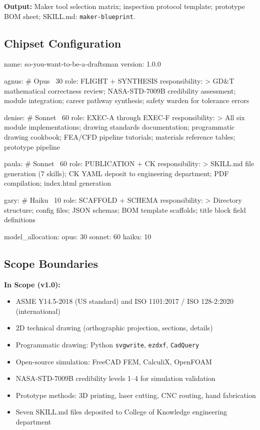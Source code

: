 \documentclass[11pt,letterpaper]{article}
\begin{document}
\textbf{Output:} Maker tool selection matrix; inspection protocol template; prototype BOM sheet; SKILL.md: \texttt{maker-blueprint}.

\subsection{Chipset Configuration}

\begin{asciibox}
name: so-you-want-to-be-a-draftsman
version: 1.0.0

agnus:    \# Opus ~30%
  role: FLIGHT + SYNTHESIS
  responsibility: >
    GD\&T mathematical correctness review;
    NASA-STD-7009B credibility assessment;
    module integration; career pathway synthesis;
    safety warden for tolerance errors

denise:   \# Sonnet ~60%
  role: EXEC-A through EXEC-F
  responsibility: >
    All six module implementations;
    drawing standards documentation;
    programmatic drawing cookbook;
    FEA/CFD pipeline tutorials;
    materials reference tables;
    prototype pipeline

paula:    \# Sonnet ~60%
  role: PUBLICATION + CK
  responsibility: >
    SKILL.md file generation (7 skills);
    CK YAML deposit to engineering department;
    PDF compilation; index.html generation

gary:     \# Haiku ~10%
  role: SCAFFOLD + SCHEMA
  responsibility: >
    Directory structure; config files;
    JSON schemas; BOM template scaffolds;
    title block field definitions

model\_allocation:
  opus: 30%
  sonnet: 60%
  haiku: 10%
\end{asciibox}

\subsection{Scope Boundaries}

\textbf{In Scope (v1.0):}
\begin{itemize}[noitemsep]
  \item ASME Y14.5-2018 (US standard) and ISO 1101:2017 / ISO 128-2:2020 (international)
  \item 2D technical drawing (orthographic projection, sections, details)
  \item Programmatic drawing: Python \texttt{svgwrite}, \texttt{ezdxf}, \texttt{CadQuery}
  \item Open-source simulation: FreeCAD FEM, CalculiX, OpenFOAM
  \item NASA-STD-7009B credibility levels 1--4 for simulation validation
  \item Prototype methods: 3D printing, laser cutting, CNC routing, hand fabrication
  \item Seven SKILL.md files deposited to College of Knowledge engineering department
\end{itemize}
\end{document}
